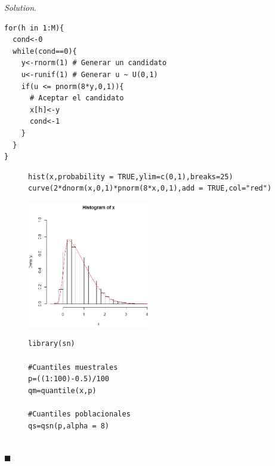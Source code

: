 \documentclass[11pt]{article}
\renewcommand{\=}[1]{\stackrel{#1}{=}} %
\theoremstyle{definition}
\theoremstyle{remark}
\newenvironment{solution}{%
\begin{trivlist} \item \textit{Solution}. }{%
\hspace*{\fill} $\blacksquare$\end{trivlist}}
\begin{document}
\begin{itemize}
\begin{solution}
{\begin{lstlisting}[style=myRstyle, caption={Algoritmo de aceptación y rechazo.}]
for(h in 1:M){
  cond<-0
  while(cond==0){
    y<-rnorm(1) # Generar un candidato
    u<-runif(1) # Generar u ~ U(0,1)
    if(u <= pnorm(8*y,0,1)){ 
      # Aceptar el candidato
      x[h]<-y
      cond<-1
    }	
  }
}
	\end{lstlisting}
}
	\begin{figure}[h]
	\hspace*{0.9cm}\begin{minipage}{9.8cm}
		{
			\begin{lstlisting}[style=myRstyle, caption={Verificación mediante histograma / SN.}]
hist(x,probability = TRUE,ylim=c(0,1),breaks=25)
curve(2*dnorm(x,0,1)*pnorm(8*x,0,1),add = TRUE,col="red")
			\end{lstlisting}
		}			
	\end{minipage}
	\begin{minipage}{2cm}
		\includegraphics[width=5.5cm]{a2}
	\end{minipage}
\end{figure}
\newpage
	\begin{figure}[h]
	\hspace*{0.9cm}\begin{minipage}{10.3cm}
		{
			\begin{lstlisting}[style=myRstyle, caption={Verificación mediante gráfica de cuantiles / SN.}]
library(sn)

#Cuantiles muestrales
p=((1:100)-0.5)/100
qm=quantile(x,p)

#Cuantiles poblacionales
qs=qsn(p,alpha = 8)


\end{lstlisting}}
\end{minipage}
\end{figure}
\end{solution}
\end{itemize}
\end{document}
